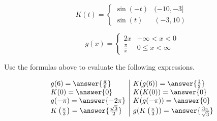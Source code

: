 \documentclass{ximera}
\author{Lee Wayand}
\begin{document}
\begin{exercise}





\[
K(t) = 
\begin{cases}
  \sin(-t) &  (-10, -3]   \\
  \sin(t) & (-3, 10)
\end{cases}
\]





\[
g(x) = 
\begin{cases}
  2x  &   -\infty < x < 0 \\
  \frac{\pi}{x} &  0 \leq x < \infty
\end{cases}
\]



\begin{question}



Use the formulas above to evaluate the following expressions.



\[
\begin{array}{l|l}
g(6) = \answer{\frac{\pi}{6}}  & K(g(6)) = \answer{\frac{1}{2}}   \\
K(0) = \answer{0}  & K(K(0)) = \answer{0}   \\
g(-\pi) = \answer{-2 \pi}  & K(g(-\pi)) = \answer{0}   \\
K \left(\frac{\pi}{3} \right) = \answer{\frac{\sqrt{3}}{2}}  & g(K \left(\frac{\pi}{3} \right)) = \answer{\frac{3 \pi}{\sqrt{3}}}   
\end{array}
\]




\end{question}














\end{exercise}
\end{document}
